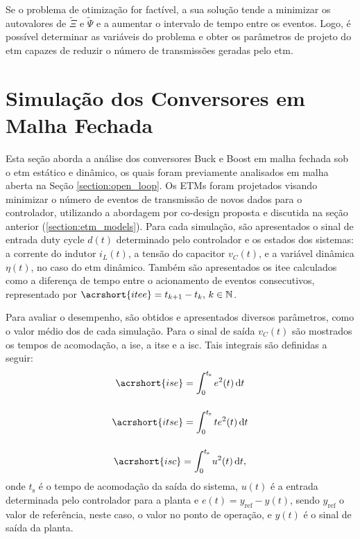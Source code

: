 Se o problema de otimização for factível, a sua solução tende a minimizar os autovalores de $\tilde{\Xi}$ e $\tilde{\Psi}$ e a aumentar o intervalo de tempo entre os eventos. Logo, é possível determinar as variáveis do problema e obter os parâmetros de projeto do \acrshort{etm} capazes de reduzir o número de transmissões geradas pelo \acrshort{etm}.

\section{Simulação dos Conversores em Malha Fechada}

Esta seção aborda a análise dos conversores Buck e Boost em malha fechada sob o \acrshort{etm} estático e dinâmico, os quais foram previamente analisados em malha aberta na Seção \ref{section:open_loop}. Os ETMs foram projetados visando minimizar o número de eventos de transmissão de novos dados para o controlador, utilizando a abordagem por co-design proposta e discutida na seção anterior (\autoref{section:etm_models}). Para cada simulação, são apresentados o sinal de entrada duty cycle $d(t)$ determinado pelo controlador e os estados dos sistemas: a corrente do indutor $i_L(t)$, a tensão do capacitor $v_C(t)$, e a variável dinâmica $\eta(t)$, no caso do \acrshort{etm} dinâmico. Também são apresentados os \acrfull{itee} calculados como a diferença de tempo entre o acionamento de eventos consecutivos, representado por $\acrshort{itee} = t_{k + 1} - t_k, \, k \in \mathbb{N}$.

Para avaliar o desempenho, são obtidos e apresentados diversos parâmetros, como o valor médio dos  de cada simulação. Para o sinal de saída  $v_C(t)$ são mostrados os tempos de acomodação, a \acrfull{ise}, a \acrfull{itse} e a \acrfull{isc}. Tais integrais são definidas a seguir: \begin{gather}
  \acrshort{ise} = \int_0^{t_\mathrm{s}} e^2(t) \, \mathrm{d}t \\[12pt]
  \acrshort{itse} = \int_0^{t_\mathrm{s}} t e^2(t) \, \mathrm{d}t \\[12pt]
  \acrshort{isc} = \int_0^{t_\mathrm{s}} u^2(t) \, \mathrm{d}t,
\end{gather} onde $t_{\mathrm{s}}$ é o tempo de acomodação da saída do sistema, $u(t)$ é a entrada determinada pelo controlador para a planta e $e(t) = y_{\mathrm{ref}} - y(t)$, sendo $y_{\mathrm{ref}}$ o valor de referência, neste caso, o valor no ponto de operação, e $y(t)$ é o sinal de saída da planta.


